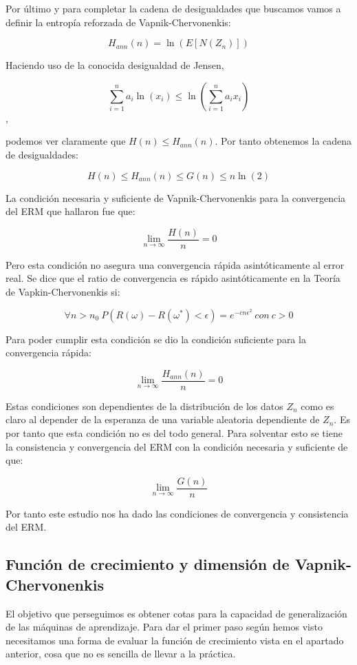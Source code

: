Por último y para completar la cadena de desigualdades que buscamos vamos a definir la entropía reforzada de Vapnik-Chervonenkis:

$$H_{ann}(n) = \ln (E[N(Z_n)])$$

Haciendo uso de la conocida desigualdad de Jensen,

$$\sum_{i=1}^{n}a_i \ln (x_i) \leq \ln (\sum_{i=1}^{n}a_i x_i)$$,

 podemos ver claramente que $H(n)\leq H_{ann}(n)$. Por tanto obtenemos la cadena de desigualdades:

$$H(n)\leq H_{ann}(n) \leq G(n) \leq n\ln (2)$$

La condición necesaria y suficiente de Vapnik-Chervonenkis para la convergencia del ERM que hallaron fue que:

$$\lim\limits_{n\rightarrow \infty} \frac{H(n)}{n} = 0$$

Pero esta condición no asegura una convergencia rápida asintóticamente al error real. Se dice que el ratio de convergencia es rápido asintóticamente en la Teoría de Vapkin-Chervonenkis si:

$$\forall n>n_0 \ P(R(\omega) - R(\omega^*)<\epsilon) = e^{-cn\epsilon^2} \ con \ c>0$$

Para poder cumplir esta condición se dio la condición suficiente para la convergencia rápida:

$$\lim\limits_{n\rightarrow \infty} \frac{H_{ann}(n)}{n} = 0$$

Estas condiciones son dependientes de la distribución de los datos $Z_n$ como es claro al depender de la esperanza de una variable aleatoria dependiente de $Z_n$. Es por tanto que esta condición no es del todo general. Para solventar esto se tiene la consistencia y convergencia del ERM con la condición necesaria y suficiente de que:

$$\lim\limits_{n\rightarrow \infty}\frac{G(n)}{n}$$

Por tanto este estudio nos ha dado las condiciones de convergencia y consistencia del ERM.

\subsection{Función de crecimiento y dimensión de Vapnik-Chervonenkis}

El objetivo que perseguimos es obtener cotas para la capacidad de generalización de las máquinas de aprendizaje. Para dar el primer paso según hemos visto necesitamos una forma de evaluar la función de crecimiento vista en el apartado anterior, cosa que no es sencilla de llevar a la práctica.

